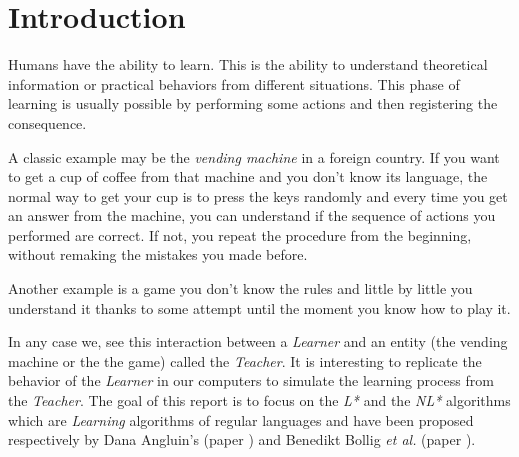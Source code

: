 \section{Introduction}
\label{sec:intro}




Humans have the ability to learn. This is the ability to understand theoretical information or practical behaviors from different situations. This phase of learning is usually possible by performing some actions and then registering the consequence.

A classic example may be the \textit{vending machine} in a foreign country. If you want to get a cup of coffee from that machine and you don't know its language, the normal way to get your cup is to press the keys randomly and every time you get an answer from the machine, you can understand if the sequence of actions you performed are correct. If not, you repeat the procedure from the beginning, without remaking the mistakes you made before.

Another example is a game you don't know the rules and little by little you understand it thanks to some attempt until the moment you know how to play it.

In any case we, see this interaction between a \textit{Learner} and an entity (the vending machine or the the game) called the \textit{Teacher}. It is interesting to replicate the behavior of the \textit{Learner} in our computers to simulate the learning process from the \textit{Teacher}. The goal of this report is to focus on the \textit{L*} and the \textit{NL*} algorithms which are \textit{Learning} algorithms of regular languages and have been proposed respectively by Dana Angluin's (paper \cite{LPaper}) and Benedikt Bollig \textit{et al.} (paper \cite{NLPaper}).

